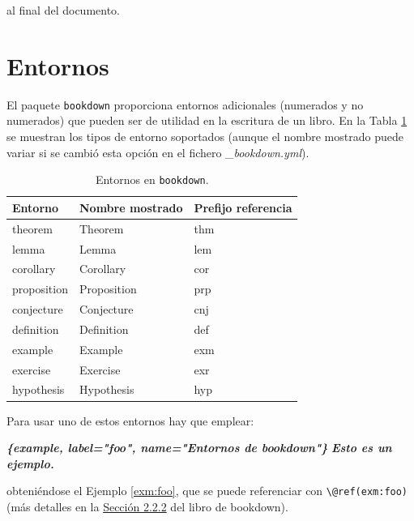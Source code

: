 \documentclass[
]{book}
\newenvironment{Shaded}{\begin{snugshade}}{\end{snugshade}}
\newcommand{\InformationTok}[1]{\textcolor[rgb]{0.56,0.35,0.01}{\textbf{\textit{#1}}}}
\theoremstyle{definition}
\theoremstyle{definition}
\theoremstyle{definition}
\theoremstyle{definition}
\theoremstyle{remark}
\begin{document}
al final del documento.

\hypertarget{entornos}{%
\section{Entornos}\label{entornos}}

El paquete \texttt{bookdown} proporciona entornos adicionales (numerados y no numerados)
que pueden ser de utilidad en la escritura de un libro.
En la Tabla \ref{tab:theorem-envs} se muestran los tipos de entorno soportados
(aunque el nombre mostrado puede variar si se cambió esta opción en el fichero \emph{\_bookdown.yml}).



\begin{table}

\caption{\label{tab:theorem-envs}Entornos en \texttt{bookdown}.}
\centering
\begin{tabular}[t]{lll}
\toprule
Entorno & Nombre mostrado & Prefijo referencia\\
\midrule
theorem & Theorem & thm\\
lemma & Lemma & lem\\
corollary & Corollary & cor\\
proposition & Proposition & prp\\
conjecture & Conjecture & cnj\\
\addlinespace
definition & Definition & def\\
example & Example & exm\\
exercise & Exercise & exr\\
hypothesis & Hypothesis & hyp\\
\bottomrule
\end{tabular}
\end{table}

Para usar uno de estos entornos hay que emplear:

\begin{Shaded}
\begin{Highlighting}[]
\InformationTok{\textasciigrave{}\textasciigrave{}\textasciigrave{}\{example, label="foo", name="Entornos de bookdown"\}}
\InformationTok{Esto es un ejemplo.}
\InformationTok{\textasciigrave{}\textasciigrave{}\textasciigrave{}}
\end{Highlighting}
\end{Shaded}

obteniéndose el Ejemplo \ref{exm:foo}, que se puede referenciar con \texttt{\textbackslash{}@ref(exm:foo)}
(más detalles en la
\href{https://bookdown.org/yihui/bookdown/markdown-extensions-by-bookdown.html\#theorems}{Sección 2.2.2}
del libro de bookdown).
\end{document}
